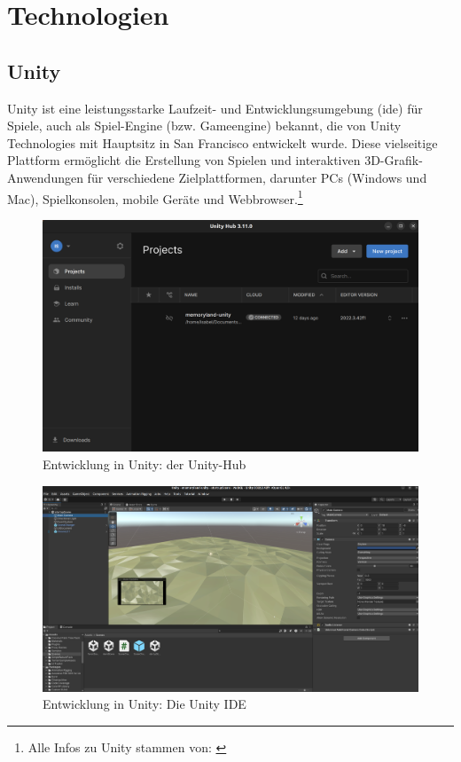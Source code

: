 
\section{Technologien}

\subsection{Unity}

Unity ist eine leistungsstarke Laufzeit- und Entwicklungsumgebung (\Gls{ide}) für Spiele, auch als Spiel-Engine (bzw. Gameengine) bekannt, die von Unity Technologies mit Hauptsitz in San Francisco entwickelt wurde. Diese vielseitige Plattform ermöglicht die Erstellung von Spielen und interaktiven 3D-Grafik-Anwendungen für verschiedene Zielplattformen, darunter PCs (Windows und Mac), Spielkonsolen, mobile Geräte und Webbrowser.\footnote{Alle Infos zu Unity stammen von: \cite{UnityDocs}}

\begin{figure} [h t]
    \centering
    \includegraphics[scale=0.15]{pics/unity-hub.png}
    \caption{Entwicklung in Unity: der Unity-Hub}
    \label{fig:unity-hub}
\end{figure}


\begin{figure} [h t]
    \centering
    \includegraphics[scale=0.12]{pics/unity-ide.png}
    \caption{Entwicklung in Unity: Die Unity IDE}
    \label{fig:unity-ide}
\end{figure}


